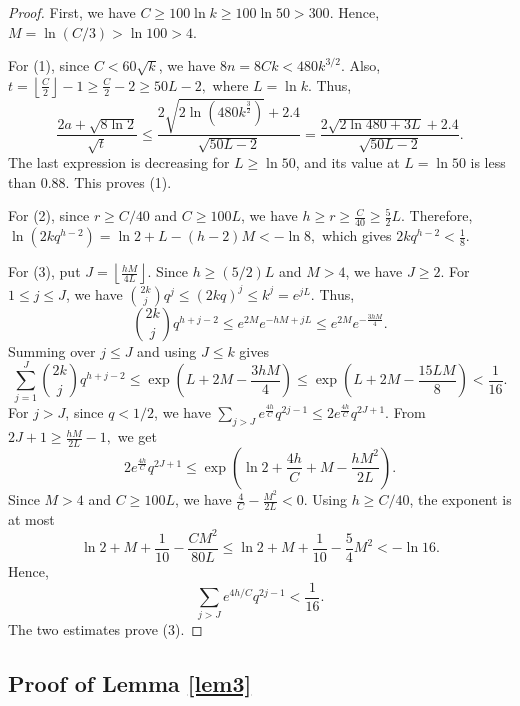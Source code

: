\documentclass[11pt]{article}
\numberwithin{equation}{section}
\begin{document}
\begin{proof}
First, we have
$
C \ge 100\ln k \ge 100\ln 50 > 300.
$
Hence,
$
M = \ln(C/3) > \ln 100 > 4.
$

For (1), since $C < 60\sqrt{k}$, we have
$
8n = 8Ck < 480k^{3/2}.
$
Also,
$
t = \left\lfloor \frac{C}{2} \right\rfloor - 1 \ge \frac{C}{2} - 2 \ge 50L - 2,
$
where $L = \ln k$. 
Thus,
$$
\frac{2a + \sqrt{8\ln 2}}{\sqrt{t}}
\le \frac{2\sqrt{2\ln(480k^{\frac{3}{2}})} + 2.4}{\sqrt{50L - 2}}
= \frac{2\sqrt{2\ln 480 + 3L} + 2.4}{\sqrt{50L - 2}}.
$$
The last expression is decreasing for $L \ge \ln 50$, and its value at $L = \ln 50$ is less than $0.88$. This proves (1).

For (2), since $r \ge C/40$ and $C \ge 100L$, we have
$
h \ge r \ge \frac{C}{40} \ge \frac{5}{2}L.
$
Therefore,
$
\ln(2k q^{h-2}) = \ln 2 + L - (h-2)M < -\ln 8,
$
which gives $2k q^{h-2} < \frac{1}{8}$.

For (3), put
$
J = \left\lfloor \frac{hM}{4L} \right\rfloor.
$
Since $h \ge (5/2)L$ and $M > 4$, we have $J \ge 2$.
For $1 \le j \le J$, we have
$
\binom{2k}{j} q^j \le (2kq)^j \le k^j = e^{jL}.
$
Thus,
$$
\binom{2k}{j} q^{h+j-2} \le e^{2M} e^{-hM + jL} \le e^{2M} e^{-\frac{3hM}{4}}.
$$
Summing over $j \le J$ and using $J \le k$ gives
$$
\sum_{j=1}^{J} \binom{2k}{j} q^{h+j-2}
\le \exp\left( L + 2M - \frac{3hM}{4} \right)
\le \exp\left( L + 2M - \frac{15LM}{8} \right)
< \frac{1}{16}.
$$
For  $j > J$, since $q < 1/2$, we have
$
\sum_{j > J} e^{\frac{4h}{C}} q^{2j-1} \le 2 e^{\frac{4h}{C}} q^{2J+1}.
$
From
$
2J+1 \ge \frac{hM}{2L} - 1,
$
we get
$$
2 e^{\frac{4h}{C}} q^{2J+1}
\le \exp\left( \ln 2 + \frac{4h}{C} + M - \frac{hM^2}{2L} \right).
$$
Since $M > 4$ and $C \ge 100L$, we have
$
\frac{4}{C} - \frac{M^2}{2L} < 0.
$
Using $h \ge C/40$, the exponent is at most
$$
\ln 2 + M + \frac{1}{10} - \frac{CM^2}{80L}
\le \ln 2 + M + \frac{1}{10} - \frac{5}{4}M^2
< -\ln 16.
$$
Hence,
$$
\sum_{j > J} e^{4h/C} q^{2j-1} < \frac{1}{16}.
$$
The two estimates prove (3).
\end{proof}




\subsection{Proof of Lemma \ref{lem3}}
\end{document}
